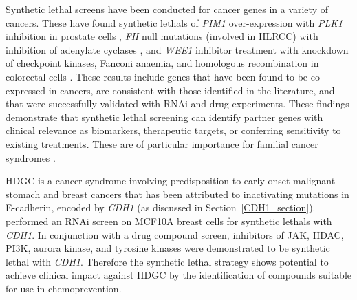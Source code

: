 
Synthetic lethal screens have been conducted for \glspl{cancer gene} in a variety of \glspl{cancer}.  These have found \glspl{synthetic lethal} of \textit{PIM1} over-expression with \textit{PLK1} inhibition  in prostate cells \citep{vanderMeer2014}, \textit{FH} null mutations (involved in \gls{HLRCC}) with inhibition of adenylate cyclases \citep{Boettcher2014}, and \textit{WEE1} inhibitor treatment with knockdown of checkpoint kinases, Fanconi anaemia, and homologous recombination in colorectal cells \citep{Aarts2015}. These results include genes that have been found to be co-expressed in cancers, are consistent with those identified in the literature, and that were successfully validated with \gls{RNAi} and drug experiments. These findings demonstrate that \gls{synthetic lethal} screening can identify partner genes with clinical relevance as biomarkers, therapeutic targets, or conferring sensitivity to existing treatments. These are of particular importance for familial cancer syndromes \citep{Boettcher2014, Telford2015}.

\Gls{HDGC} is a cancer syndrome involving predisposition to early-onset malignant stomach and breast cancers that has been attributed to inactivating \glspl{mutation} in \gls{E-cadherin}, encoded by \textit{CDH1} (as discussed in Section~\ref{CDH1_section}). \citet{Telford2015} performed an \gls{RNAi} screen on MCF10A breast cells for \glspl{synthetic lethal} with \textit{CDH1}. In conjunction with a drug compound screen, inhibitors of \gls{JAK}, \gls{HDAC}, \gls{PI3K}, aurora kinase, and tyrosine kinases were demonstrated to be \gls{synthetic lethal} with \textit{CDH1}. Therefore the \gls{synthetic lethal} strategy shows potential to achieve clinical impact against \gls{HDGC} %
 by the identification of compounds suitable for use in \gls{chemoprevention}.

